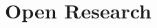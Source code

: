 \documentclass[draft]{agujournal2019}
\begin{document}
\clearpage
%

%
%

%

%




%
%
%
%
%
%


\section*{Open Research}
\end{document}
